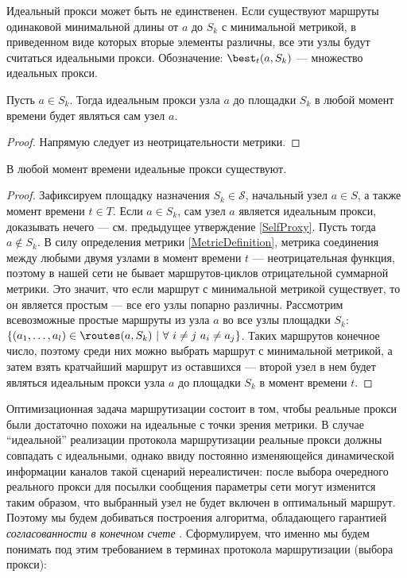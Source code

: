 \begin{remark}
    Идеальный прокси может быть не единственен. Если существуют маршруты одинаковой минимальной длины от $a$ до $S_k$ с минимальной метрикой, в приведенном виде которых вторые элементы различны, все эти узлы будут считаться идеальными прокси. Обозначение: $\best_t(a, S_k)$ --- множество идеальных прокси.
\end{remark}

\begin{claim}
\label{SelfProxy}
    Пусть $a \in S_k$. Тогда идеальным прокси узла $a$ до площадки $S_k$ в любой момент времени будет являться сам узел $a$.
\end{claim}
\begin{proof}
    Напрямую следует из неотрицательности метрики.
\end{proof}

\begin{claim}
\label{IdealProxyExistance}
    В любой момент времени идеальные прокси существуют.
\end{claim}
\begin{proof}
    Зафиксируем площадку назначения $S_k \in \mathcal{S}$, начальный узел $a \in S$, а также момент времени $t \in T$. Если $a \in S_k$, сам узел $a$ является идеальным прокси, доказывать нечего --- см. предыдущее утверждение \ref{SelfProxy}. Пусть тогда $a \notin S_k$. В силу определения метрики \ref{MetricDefinition}, метрика соединения между любыми двумя узлами в момент времени $t$ --- неотрицательная функция, поэтому в нашей сети не бывает маршрутов-циклов отрицательной суммарной метрики. Это значит, что если маршрут с минимальной метрикой существует, то он является простым --- все его узлы попарно различны. Рассмотрим всевозможные простые маршруты из узла $a$ во все узлы площадки $S_k$: $\{(a_1, \ldots, a_l) \in \routes(a, S_k)\ |\ \forall\ i \neq j\ a_i \neq a_j\}$. Таких маршрутов конечное число, поэтому среди них можно выбрать маршрут с минимальной метрикой, а затем взять кратчайший маршрут из оставшихся --- второй узел в нем будет являться идеальным прокси узла $a$ до площадки $S_k$ в момент времени $t$.
\end{proof}

Оптимизационная задача маршрутизации состоит в том, чтобы реальные прокси были достаточно похожи на идеальные с точки зрения метрики. В случае \enquote{идеальной} реализации протокола маршрутизации реальные прокси должны совпадать с идеальными, однако ввиду постоянно изменяющейся динамической информации каналов такой сценарий нереалистичен: после выбора очередного реального прокси для посылки сообщения параметры сети могут изменится таким образом, что выбранный узел не будет включен в оптимальный маршрут. Поэтому мы будем добиваться построения алгоритма, обладающего гарантией \textit{согласованности в конечном счете} \cite{eventual_consistency:10.1145/1435417.1435432}. Сформулируем, что именно мы будем понимать под этим требованием в терминах протокола маршрутизации (выбора прокси):

